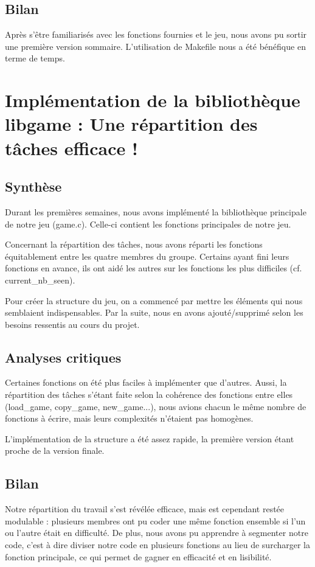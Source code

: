 \documentclass[12pt]{article}
\begin{document}
\subsection{Bilan}
Après s'être familiarisés avec les fonctions fournies et le jeu, nous avons pu sortir une première version sommaire. L'utilisation de Makefile nous a été bénéfique en terme de temps.

\section{Implémentation de la bibliothèque libgame : Une répartition des tâches efficace !}
\subsection{Synthèse}
Durant les premières semaines, nous avons implémenté la bibliothèque principale de notre jeu (game.c). Celle-ci contient les fonctions principales de notre jeu.

Concernant la répartition des tâches, nous avons réparti les fonctions équitablement entre les quatre membres du groupe. Certains ayant fini leurs fonctions en avance, ils ont aidé les autres sur les fonctions les plus difficiles (cf. current\_nb\_seen).

Pour créer la structure du jeu, on a commencé par mettre les éléments qui nous semblaient indispensables. Par la suite, nous en avons ajouté/supprimé selon les besoins ressentis au cours du projet.

\subsection{Analyses critiques}
Certaines fonctions on été plus faciles à implémenter que d'autres. Aussi, la répartition des tâches s'étant faite selon la cohérence des fonctions entre elles (load\_game, copy\_game, new\_game...), nous avions chacun le même nombre de fonctions à écrire, mais leurs complexités n'étaient pas homogènes.

L'implémentation de la structure a été assez rapide, la première version étant proche de la version finale.

\subsection{Bilan}
Notre répartition du travail s'est révélée efficace, mais est cependant restée modulable : plusieurs membres ont pu coder une même fonction ensemble si l'un ou l'autre était en difficulté. De plus, nous avons pu apprendre à segmenter notre code, c'est à dire diviser notre code en plusieurs fonctions au lieu de surcharger la fonction principale, ce qui permet de gagner en efficacité et en lisibilité.
\end{document}

